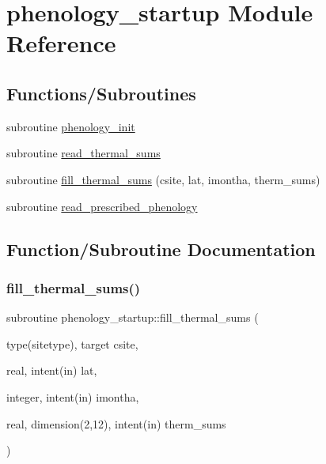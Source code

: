 \hypertarget{namespacephenology__startup}{}\section{phenology\+\_\+startup Module Reference}
\label{namespacephenology__startup}
\subsection*{Functions/\+Subroutines}
\begin{DoxyCompactItemize}
\item 
subroutine \hyperlink{namespacephenology__startup_abebba7585ef5aec3dd00f7cfa0b56067}{phenology\+\_\+init}
\item 
subroutine \hyperlink{namespacephenology__startup_aca2b4422c059ad87aee0f7aa7f7c8964}{read\+\_\+thermal\+\_\+sums}
\item 
subroutine \hyperlink{namespacephenology__startup_a7e3ac783d1459d2f3ac41c2af6d761c9}{fill\+\_\+thermal\+\_\+sums} (csite, lat, imontha, therm\+\_\+sums)
\item 
subroutine \hyperlink{namespacephenology__startup_aa83586e75a022d6fcb5816972361282d}{read\+\_\+prescribed\+\_\+phenology}
\end{DoxyCompactItemize}


\subsection{Function/\+Subroutine Documentation}
\mbox{\label{namespacephenology__startup_a7e3ac783d1459d2f3ac41c2af6d761c9}} 
\subsubsection{\texorpdfstring{fill\+\_\+thermal\+\_\+sums()}{fill\_thermal\_sums()}}
{\footnotesize\ttfamily subroutine phenology\+\_\+startup\+::fill\+\_\+thermal\+\_\+sums (\begin{DoxyParamCaption}\item[{type(sitetype), target}]{csite,  }\item[{real, intent(in)}]{lat,  }\item[{integer, intent(in)}]{imontha,  }\item[{real, dimension(2,12), intent(in)}]{therm\+\_\+sums }\end{DoxyParamCaption})}


